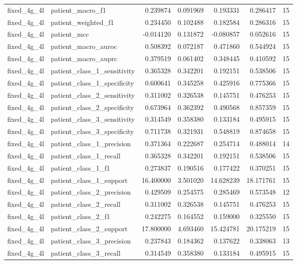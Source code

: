 \begin{tabular}{llrrrrr}
fixed_4g_4l & patient_macro_f1 & 0.239874 & 0.091969 & 0.193331 & 0.286417 & 15 \\
fixed_4g_4l & patient_weighted_f1 & 0.234450 & 0.102488 & 0.182584 & 0.286316 & 15 \\
fixed_4g_4l & patient_mcc & -0.014120 & 0.131872 & -0.080857 & 0.052616 & 15 \\
fixed_4g_4l & patient_macro_auroc & 0.508392 & 0.072187 & 0.471860 & 0.544924 & 15 \\
fixed_4g_4l & patient_macro_auprc & 0.379519 & 0.061402 & 0.348445 & 0.410592 & 15 \\
fixed_4g_4l & patient_class_1_sensitivity & 0.365328 & 0.342201 & 0.192151 & 0.538506 & 15 \\
fixed_4g_4l & patient_class_1_specificity & 0.600641 & 0.345258 & 0.425916 & 0.775366 & 15 \\
fixed_4g_4l & patient_class_2_sensitivity & 0.311002 & 0.326538 & 0.145751 & 0.476253 & 15 \\
fixed_4g_4l & patient_class_2_specificity & 0.673964 & 0.362392 & 0.490568 & 0.857359 & 15 \\
fixed_4g_4l & patient_class_3_sensitivity & 0.314549 & 0.358380 & 0.133184 & 0.495915 & 15 \\
fixed_4g_4l & patient_class_3_specificity & 0.711738 & 0.321931 & 0.548819 & 0.874658 & 15 \\
fixed_4g_4l & patient_class_1_precision & 0.371364 & 0.222687 & 0.254714 & 0.488014 & 14 \\
fixed_4g_4l & patient_class_1_recall & 0.365328 & 0.342201 & 0.192151 & 0.538506 & 15 \\
fixed_4g_4l & patient_class_1_f1 & 0.273837 & 0.190516 & 0.177422 & 0.370251 & 15 \\
fixed_4g_4l & patient_class_1_support & 16.400000 & 3.501020 & 14.628239 & 18.171761 & 15 \\
fixed_4g_4l & patient_class_2_precision & 0.429509 & 0.254575 & 0.285469 & 0.573548 & 12 \\
fixed_4g_4l & patient_class_2_recall & 0.311002 & 0.326538 & 0.145751 & 0.476253 & 15 \\
fixed_4g_4l & patient_class_2_f1 & 0.242275 & 0.164552 & 0.159000 & 0.325550 & 15 \\
fixed_4g_4l & patient_class_2_support & 17.800000 & 4.693460 & 15.424781 & 20.175219 & 15 \\
fixed_4g_4l & patient_class_3_precision & 0.237843 & 0.184362 & 0.137622 & 0.338063 & 13 \\
fixed_4g_4l & patient_class_3_recall & 0.314549 & 0.358380 & 0.133184 & 0.495915 & 15 \\

\end{tabular}
